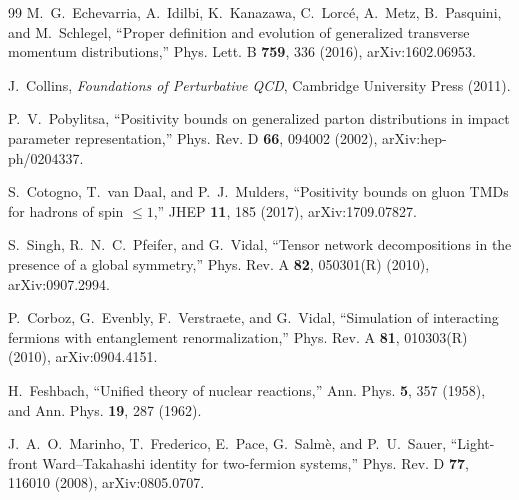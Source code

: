 \documentclass[11pt]{article}
\begin{document}
\begin{thebibliography}{99}
M.~G.~Echevarria, A.~Idilbi, K.~Kanazawa, C.~Lorc\'e, A.~Metz,
B.~Pasquini, and M.~Schlegel,
``Proper definition and evolution of generalized transverse momentum
distributions,''
Phys. Lett. B \textbf{759}, 336 (2016),
arXiv:1602.06953.

J.~Collins,
\emph{Foundations of Perturbative QCD},
Cambridge University Press (2011).

P.~V.~Pobylitsa,
``Positivity bounds on generalized parton distributions in impact parameter
representation,''
Phys. Rev. D \textbf{66}, 094002 (2002),
arXiv:hep-ph/0204337.

S.~Cotogno, T.~van Daal, and P.~J.~Mulders,
``Positivity bounds on gluon TMDs for hadrons of spin \(\leq1\),''
JHEP \textbf{11}, 185 (2017),
arXiv:1709.07827.

S.~Singh, R.~N.~C.~Pfeifer, and G.~Vidal,
``Tensor network decompositions in the presence of a global symmetry,''
Phys. Rev. A \textbf{82}, 050301(R) (2010),
arXiv:0907.2994.

P.~Corboz, G.~Evenbly, F.~Verstraete, and G.~Vidal,
``Simulation of interacting fermions with entanglement renormalization,''
Phys. Rev. A \textbf{81}, 010303(R) (2010),
arXiv:0904.4151.

H.~Feshbach,
``Unified theory of nuclear reactions,''
Ann. Phys. \textbf{5}, 357 (1958),
and Ann. Phys. \textbf{19}, 287 (1962).

J.~A.~O.~Marinho, T.~Frederico, E.~Pace, G.~Salm\`e, and P.~U.~Sauer,
``Light-front Ward--Takahashi identity for two-fermion systems,''
Phys. Rev. D \textbf{77}, 116010 (2008),
arXiv:0805.0707.

\end{thebibliography}
\end{document}
